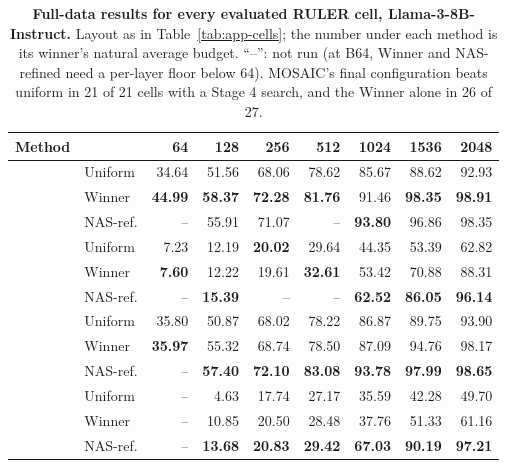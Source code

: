 \begin{table}[t]
  \centering
  \scriptsize
  \setlength{\tabcolsep}{9pt}
  \renewcommand{\arraystretch}{0.9}
\begin{tabular}{@{} c l rrrrrrr @{}}
  \toprule
  \textbf{Method} & & \textbf{64} & \textbf{128} & \textbf{256} & \textbf{512} & \textbf{1024} & \textbf{1536} & \textbf{2048} \\
  \midrule
   & Uniform & 34.64 & 51.56 & 68.06 & 78.62 & 85.67 & 88.62 & 92.93 \\
   & Winner & \textbf{44.99} & \textbf{58.37} & \textbf{72.28} & \textbf{81.76} & 91.46 & \textbf{98.35} & \textbf{98.91} \\
   & NAS-ref. & -- & 55.91 & 71.07 & -- & \textbf{93.80} & 96.86 & 98.35 \\
  \midrule
   & Uniform & 7.23 & 12.19 & \textbf{20.02} & 29.64 & 44.35 & 53.39 & 62.82 \\
   & Winner & \textbf{7.60} & 12.22 & 19.61 & \textbf{32.61} & 53.42 & 70.88 & 88.31 \\
   & NAS-ref. & -- & \textbf{15.39} & -- & -- & \textbf{62.52} & \textbf{86.05} & \textbf{96.14} \\
  \midrule
   & Uniform & 35.80 & 50.87 & 68.02 & 78.22 & 86.87 & 89.75 & 93.90 \\
   & Winner & \textbf{35.97} & 55.32 & 68.74 & 78.50 & 87.09 & 94.76 & 98.17 \\
   & NAS-ref. & -- & \textbf{57.40} & \textbf{72.10} & \textbf{83.08} & \textbf{93.78} & \textbf{97.99} & \textbf{98.65} \\
  \midrule
   & Uniform & -- & 4.63 & 17.74 & 27.17 & 35.59 & 42.28 & 49.70 \\
   & Winner & -- & 10.85 & 20.50 & 28.48 & 37.76 & 51.33 & 61.16 \\
   & NAS-ref. & -- & \textbf{13.68} & \textbf{20.83} & \textbf{29.42} & \textbf{67.03} & \textbf{90.19} & \textbf{97.21} \\
  \bottomrule
\end{tabular}
  \caption{\textbf{Full-data results for every evaluated RULER cell, Llama-3-8B-Instruct.} Layout as in Table~\ref{tab:app-cells}; the number under each method is its winner's natural average budget. ``--'': not run (at B64, Winner and NAS-refined need a per-layer floor below 64). MOSAIC's final configuration beats uniform in 21 of 21 cells with a Stage 4 search, and the Winner alone in 26 of 27.}
  \label{tab:app-cells-ruler}
\end{table}

